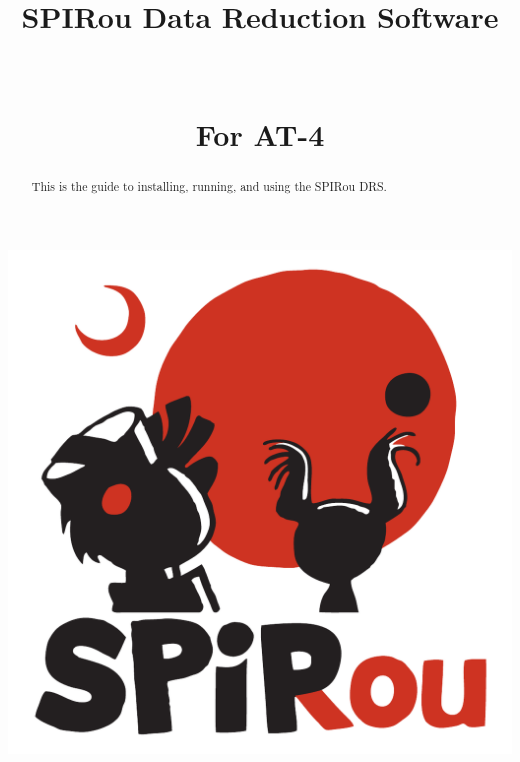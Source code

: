 \documentclass[
a4paper, %
10pt, %
onecolumn, %
openany, %
]{memoir}
\author{\MyAuthors}
\title{{\Huge SPIRou Data Reduction Software} \vspace{1cm} \\ \HUGE{User Manual} \\ {\small \MyVersion} \\ For AT-4}
\date{\MyDate}
\begin{document}
\frontmatter

\maketitle

\vspace{1cm}
\begin{center}
\includegraphics[width=.5\textwidth]{figures/Logo_SPIRou-22.pdf}
\end{center}
\vspace{1cm}

\begin{abstract}
This is the guide to installing, running, and using the SPIRou DRS.
\end{abstract}
\clearpage

\tableofcontents*
\clearpage




\mainmatter

















\appendix





\backmatter


% 
% 
\end{document}
